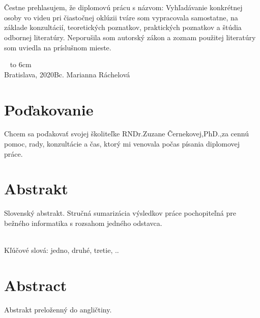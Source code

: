 \documentclass[12pt, a4paper, oneside]{book}
\newcommand\mfauthor{Bc. Marianna Ráchelová}
\newcommand\mfplacedate{Bratislava, 2020}
\begin{document}

\thispagestyle{empty}


\begin{figure}[H]
\vspace{-9em}
\begin{center}
\label{img:zadanie}
\end{center}
\end{figure}

{~}\vspace{12cm}

\thispagestyle{empty}
\noindent
\begin{minipage}{0.25\textwidth}~\end{minipage}
\begin{minipage}{0.75\textwidth}
Čestne prehlasujem, že diplomovú prácu s názvom: Vyhľadávanie konkrétnej osoby vo videu pri čiastočnej oklúzii tváre som vypracovala samostatne, na základe konzultácií, teoretických poznatkov, praktických poznatkov a štúdia odbornej literatúry. Neporušila som autorský zákon a zoznam použitej literatúry som uviedla na príslušnom mieste.
\end{minipage}
\vfill
~ \hfill {\hbox to 6cm{\dotfill}} \\
\mfplacedate \hfill \mfauthor
\vfill\eject 

\chapter*{Poďakovanie}\label{chap:thank_you}
Chcem sa poďakovať svojej školiteľke RNDr.Zuzane Černekovej,PhD.,za cennú pomoc, rady, konzultácie a čas, ktorý mi venovala počas písania diplomovej práce.
\vfill\eject 

\chapter*{Abstrakt}\label{chap:abstract_sk}
Slovenský abstrakt. Stručná sumarizácia výsledkov práce pochopiteľná pre bežného informatika s rozsahom jedného odstavca. 

~\\
Kľúčové slová: jedno, druhé, tretie, .. 
\vfill\eject 

\chapter*{Abstract}\label{chap:abstract_en}
Abstrakt preloženný do angličtiny.
\end{document}
